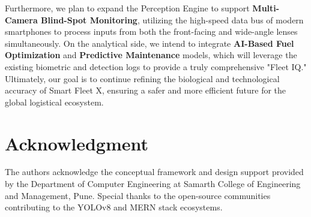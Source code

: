 \documentclass[conference]{IEEEtran}
\begin{document}
Furthermore, we plan to expand the Perception Engine to support \textbf{Multi-Camera Blind-Spot Monitoring}, utilizing the high-speed data bus of modern smartphones to process inputs from both the front-facing and wide-angle lenses simultaneously. On the analytical side, we intend to integrate \textbf{AI-Based Fuel Optimization} and \textbf{Predictive Maintenance} models, which will leverage the existing biometric and detection logs to provide a truly comprehensive "Fleet IQ." Ultimately, our goal is to continue refining the biological and technological accuracy of Smart Fleet X, ensuring a safer and more efficient future for the global logistical ecosystem.

\section*{Acknowledgment}
The authors acknowledge the conceptual framework and design support provided by the Department of Computer Engineering at Samarth College of Engineering and Management, Pune. Special thanks to the open-source communities contributing to the YOLOv8 and MERN stack ecosystems.
\end{document}
